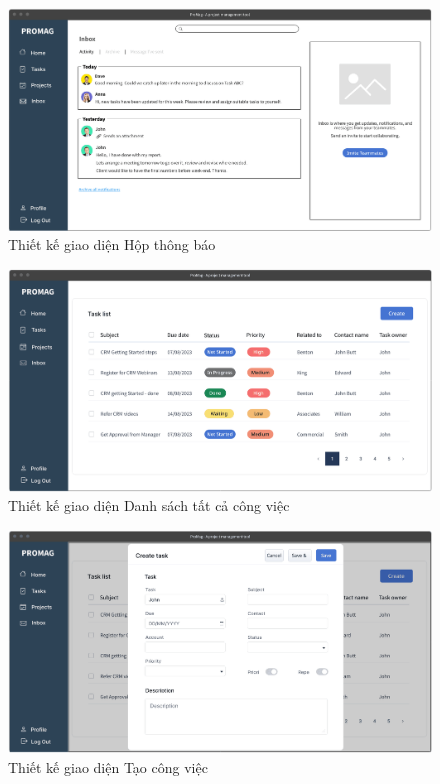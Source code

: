 \documentclass[../DoAn.tex]{subfiles}
\begin{document}
\begin{figure}[H]
    \centering
    \includegraphics[width=1.0\linewidth]{Hinhve/Mockup_Inbox.png}
    \caption{Thiết kế giao diện Hộp thông báo}
    \label{fig:Mockup_Inbox}
\end{figure}

\newpage

\begin{figure}[H]
    \centering
    \includegraphics[width=1.0\linewidth]{Hinhve/Mockup_AllTaskList.png}
    \caption{Thiết kế giao diện Danh sách tất cả công việc}
    \label{fig:Mockup_AllTaskList}
\end{figure}

\begin{figure}[H]
    \centering
    \includegraphics[width=1.0\linewidth]{Hinhve/Mockup_CreateTask.png}
    \caption{Thiết kế giao diện Tạo công việc}
    \label{fig:Mockup_CreateTask}
\end{figure}
\end{document}

